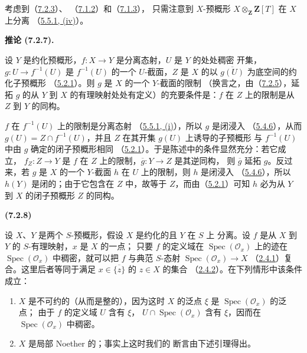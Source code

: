 \documentclass[UTF8,fontset=none,11pt,oneside,openany]{ctexbook}
\newenvironment{env}[1][]{%
  \par\medskip\noindent\textbf{(#1)}\ %
}{\par}
\newenvironment{corollary}[1][]{%
  \par\medskip\noindent\textbf{推论 (#1).}\ %
}{\par}
\let\EGAOriginalLabel\label
\renewcommand{\label}[1]{\phantomsection\EGAOriginalLabel{#1}}
\begin{document}
考虑到（\hyperref[I.7.2.3-fr]{7.2.3}）、
（\hyperref[I.7.1.2-fr]{7.1.2}）和（\hyperref[I.7.1.3-fr]{7.1.3}），
只需注意到 $X$-预概形 $X\otimes_{\mathbf Z}\mathbf Z[T]$ 在 $X$ 上分离
（\hyperref[I.5.5.1-fr]{5.5.1, (iv)}）。

\begin{corollary}[7.2.7]
\label{I.7.2.7-fr}
设 $Y$ 是约化预概形，$f:X\to Y$ 是分离态射，$U$ 是 $Y$ 的处处稠密
开集，$g:U\to f^{-1}(U)$ 是 $f^{-1}(U)$ 的一个 $U$-截面，$Z$ 是 $X$
的以 $\overline{g(U)}$ 为底空间的约化子预概形
（\hyperref[I.5.2.1-fr]{5.2.1}）。则 $g$ 是 $X$ 的一个 $Y$-截面的限制
（换言之，由（\hyperref[I.7.2.5-fr]{7.2.5}），延拓 $g$ 的从 $Y$ 到
$X$ 的有理映射处处有定义）的充要条件是：$f$ 在 $Z$ 上的限制是从
$Z$ 到 $Y$ 的同构。
\end{corollary}

$f$ 在 $f^{-1}(U)$ 上的限制是分离态射
（\hyperref[I.5.5.1-fr]{5.5.1, (i)}），所以 $g$ 是闭浸入
（\hyperref[I.5.4.6-fr]{5.4.6}），从而
$g(U)=Z\cap f^{-1}(U)$，并且 $Z$ 在其开集 $g(U)$ 上诱导的子预概形
与 $f^{-1}(U)$ 中由 $g$ 确定的闭子预概形相同
（\hyperref[I.5.2.1-fr]{5.2.1}）。于是陈述中的条件显然充分：若它成立，
$f_Z:Z\to Y$ 是 $f$ 在 $Z$ 上的限制，$\overline g:Y\to Z$ 是其逆同构，
则 $\overline g$ 延拓 $g$。反过来，若 $g$ 是 $X$ 的一个 $Y$-截面 $h$
在 $U$ 上的限制，则 $h$ 是闭浸入
（\hyperref[I.5.4.6-fr]{5.4.6}），所以 $h(Y)$ 是闭的；由于它包含在
$Z$ 中，故等于 $Z$，而由（\hyperref[I.5.2.1-fr]{5.2.1}）可知 $h$
必为从 $Y$ 到 $X$ 的闭子预概形 $Z$ 的同构。

\begin{env}[7.2.8]
\label{I.7.2.8-fr}
设 $X$、$Y$ 是两个 $S$-预概形，假设 $X$ 是约化的且 $Y$ 在 $S$ 上
分离。设 $f$ 是从 $X$ 到 $Y$ 的 $S$-有理映射，$x$ 是 $X$ 的一点；
只要 $f$ 的定义域在 $\operatorname{Spec}(\mathscr{O}_x)$ 上的迹在
$\operatorname{Spec}(\mathscr{O}_x)$ 中稠密，就可以把 $f$ 与典范
$S$-态射 $\operatorname{Spec}(\mathscr{O}_x)\to X$
（\hyperref[I.2.4.1-fr]{2.4.1}）复合。这里后者等同于满足
$x\in\overline{\{z\}}$ 的 $z\in X$ 的集合
（\hyperref[I.2.4.2-fr]{2.4.2}）。在下列情形中该条件成立：
\begin{enumerate}
  \item[1\textsuperscript{o}] $X$ 是不可约的（从而是整的），因为这时
    $X$ 的泛点 $\xi$ 是 $\operatorname{Spec}(\mathscr{O}_x)$ 的泛点；
    由于 $f$ 的定义域 $U$ 含有 $\xi$，
    $U\cap\operatorname{Spec}(\mathscr{O}_x)$ 含有 $\xi$，因而在
    $\operatorname{Spec}(\mathscr{O}_x)$ 中稠密。
  \item[2\textsuperscript{o}] $X$ 是局部 Noether 的；事实上这时我们的
    断言由下述引理得出。
\end{enumerate}
\end{env}
\end{document}
